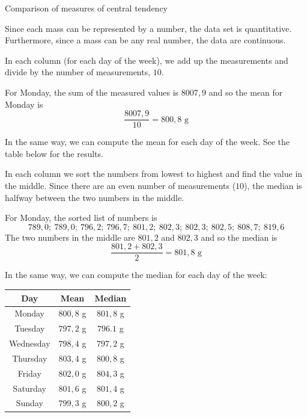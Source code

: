 \begin{wex}{Comparison of measures of central tendency}
{  

  Since each mass can be represented by a number, the data
  set is quantitative. Furthermore, since a mass can be any real
  number, the data are continuous.


  In each column (for each day of the week), we add up the
  measurements and divide by the number of measurements, $10$.

  For Monday, the sum of the measured values is $8007,9$ and so the
  mean for Monday is
  \begin{equation*}
    \frac{8007,9}{10} = 800,8\mbox{ g}
  \end{equation*}

  In the same way, we can compute the mean for each day of the
  week. See the table below for the results.


  In each column we sort the numbers from lowest to highest and find
  the value in the middle. Since there are an even number of
  measurements ($10$), the median is halfway between the two numbers in
  the middle.

  For Monday, the sorted list of numbers is
  \begin{equation*}
    789,0;\ 789,0;\ 796,2;\ 796,7;\ 801,2;\ 802,3;\ 802,3;\ 802,5;\ 808,7;\ 819,6
  \end{equation*}
  The two numbers in the middle are $801,2$ and $802,3$ and so the
  median is
  \begin{equation*}
    \frac{801,2 + 802,3}{2} = 801,8\mbox{ g}
  \end{equation*}

  In the same way, we can compute the median for each day of the
  week:

  \begin{center}
    \begin{tabular}{|c|c|c|} \hline

      \textbf{Day} & \textbf{Mean} &\textbf{Median} \\  \hline
  
      Monday & $800,8$ g & $801,8$ g \\ \hline
     Tuesday & $797,2$ g & $796.1$ g \\ \hline
      Wednesday & $798,4$ g & $797,2$ g \\ \hline
    Thursday & $803,4$ g & $800,8$ g \\ \hline
     Friday & $802,0$ g & $804,3$ g \\ \hline
      Saturday & $801,6$ g & $801,4$ g \\ \hline
     Sunday & $799,3$ g & $800,2$ g \\ \hline


\end{tabular}
\end{center}}
\end{wex}
